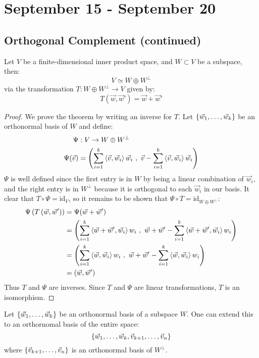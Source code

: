 \chapter{September 15 - September 20}

\section{Orthogonal Complement (continued)}

\begin{theorem}\label{orthisomorphism}
  Let $V$ be a finite-dimensional inner product space, and $W \subset V$ be a subspace, then:
    $$V \simeq W \oplus W^\perp$$
  via the transformation $T : W \oplus W^\perp \to V$ given by:
    $$T(\vec w, \vec w') = \vec w + \vec w'$$
\end{theorem}
\begin{proof}
  We prove the theorem by writing an inverse for $T$.
  Let $\left\{\vec w_1, \ldots, \vec w_k\right\}$ be an orthonormal basis of $W$ and define:
  \begin{align}
    \Psi &: V \to W \oplus W^\perp \\
    \Psi(\vec v) &= \left(\sum_{i=1}^k \left\langle \vec v , \vec w_i \right\rangle\vec w_i ~,~ \vec v - \sum_{i=1}^k \left\langle \vec v , \vec w_i \right\rangle\vec w_i\right)
  \end{align}
  $\Psi$ is well defined since the first entry is in $W$ by being a linear combination of $\vec w_i$, and the right entry is in $W^\perp$ because it is orthogonal to each $\vec w_i$ in our basis.
  It clear that $T \circ \Psi = \text{id}_V$, so it remains to be shown that $\Psi \circ T = \text{id}_{W \oplus W^\perp}$:
  \begin{align}
    \Psi\left(T\left(\vec w, \vec w'\right)\right)
      &= \Psi(\vec w + \vec w') \\
      &= \left(\sum_{i=1}^k \left\langle \vec w + \vec w' , \vec w_i \right\rangle w_i ~,~ \vec w + \vec w' - \sum_{i=1}^k \left\langle \vec w + \vec w' , \vec w_i \right\rangle w_i\right) \\
      &= \left(\sum_{i=1}^k \left\langle \vec w , \vec w_i \right\rangle w_i ~,~ \vec w + \vec w' - \sum_{i=1}^k \left\langle \vec w , \vec w_i \right\rangle w_i\right) \\
      &= \left(\vec w, \vec w'\right)
  \end{align}
  Thus $T$ and $\Psi$ are inverses. Since $T$ and $\Psi$ are linear transformations, $T$ is an isomorphism.
\end{proof}

\begin{corollary}
  Let $\left\{\vec w_1, \ldots, \vec w_k\right\}$ be an orthonormal basis of a subspace $W$.
  One can extend this to an orthornomal basis of the entire space:
    $$\left\{\vec w_1, \ldots, \vec w_k, \vec v_{k+1}, \ldots, \vec v_n\right\}$$
  where $\left\{\vec v_{k+1}, \ldots, \vec v_n\right\}$ is an orthonormal basis of $W^\perp$.
\end{corollary}

